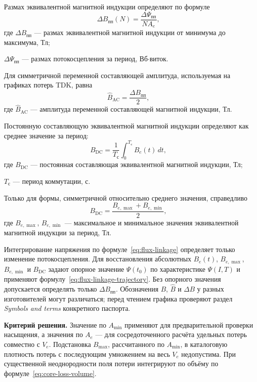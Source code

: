 \documentclass[14pt,a4paper]{extarticle}
\newcommand{\criterion}{\par\noindent\textbf{Критерий решения.} }
\begin{document}
Размах эквивалентной магнитной индукции определяют по формуле
\begin{equation}
 \Delta B_{\text{пп}}(N)=
 \frac{\Delta\Psi_{\text{пп}}}{N A_e},
 \label{eq:delta-b}
\end{equation}
где $\Delta B_{\text{пп}}$ --- размах эквивалентной магнитной индукции от
минимума до максимума, Тл;\par\noindent
$\Delta\Psi_{\text{пп}}$ --- размах потокосцепления за период,
Вб$\cdot$виток.

Для симметричной переменной составляющей амплитуда, используемая на
графиках потерь TDK, равна
\begin{equation}
 \widehat B_{\text{AC}}=
 \frac{\Delta B_{\text{пп}}}{2},
 \label{eq:bhat-ac}
\end{equation}
где $\widehat B_{\text{AC}}$ --- амплитуда переменной составляющей
магнитной индукции, Тл.

Постоянную составляющую эквивалентной магнитной индукции определяют как
среднее значение за период:
\begin{equation}
 B_{\text{DC}}=
 \frac{1}{T_{\text{с}}}\int_0^{T_{\text{с}}}B_e(t)\,dt,
 \label{eq:bdc}
\end{equation}
где $B_{\text{DC}}$ --- постоянная составляющая эквивалентной магнитной
индукции, Тл;\par\noindent
$T_{\text{с}}$ --- период коммутации, с.

Только для формы, симметричной относительно среднего значения, справедливо
\begin{equation}
 B_{\text{DC}}=
 \frac{B_{e,\max}+B_{e,\min}}{2},
 \label{eq:bdc-symmetric}
\end{equation}
где $B_{e,\max}$, $B_{e,\min}$ --- максимальное и минимальное значения
эквивалентной магнитной индукции за период, Тл.

Интегрирование напряжения по формуле~\eqref{eq:flux-linkage} определяет
только изменение потокосцепления. Для восстановления абсолютных
$B_e(t)$, $B_{e,\max}$, $B_{e,\min}$ и $B_{\text{DC}}$ задают опорное
значение $\Psi(t_0)$ по характеристике $\Psi(I,T)$ и применяют
формулу~\eqref{eq:flux-linkage-trajectory}. Без опорного значения допускается
определять только $\Delta B_{\text{пп}}$. Обозначения $B$, $\widehat B$ и
$\Delta B$ у разных изготовителей могут различаться; перед чтением графика
проверяют раздел \textit{Symbols and terms} конкретного паспорта.

\criterion Значение по $A_{\min}$ применяют для предварительной проверки
насыщения, а значения по $A_e$ --- для сосредоточенного расчёта удельных
потерь совместно с $V_e$. Подстановка $B_{\max}$, рассчитанного по
$A_{\min}$, в каталоговую плотность потерь с последующим умножением на весь
$V_e$ недопустима. При существенной неоднородности поля потери интегрируют
по объёму по формуле~\eqref{eq:core-loss-volume}.
\end{document}
